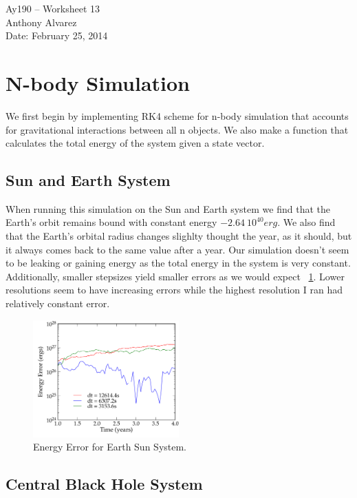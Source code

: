 \documentclass[11pt,letterpaper]{article}
\begin{document}
\begin{center}
\Large
Ay190 -- Worksheet 13\\
Anthony Alvarez\\
Date: February 25, 2014
\end{center}

\section{N-body Simulation}

We first begin by implementing RK4 scheme for n-body simulation that accounts
 for gravitational interactions between all n objects. We also make
a function that calculates the total energy of the system given a 
state vector. 

\subsection{Sun and Earth System}

When running this simulation on the Sun and Earth system we find that the Earth's
orbit remains bound with constant energy $-2.64\ 10^{40} erg$. We also find that
the Earth's orbital radius changes slighlty thought the year, as it should, but
it always comes back to the same value after a year. Our simulation doesn't
seem to be leaking or gaining energy as the total energy in the system is
very constant. Additionally, smaller stepsizes yield smaller errors as we 
would expect ~\ref{fig:phi}. Lower resolutions seem to have increasing errors while the 
highest resolution I ran had relatively constant error. 

\begin{figure}[bth]
\centering
\includegraphics[width=0.5\textwidth]{3.pdf}
\caption{Energy Error for Earth Sun System.}
\label{fig:phi}
\end{figure}

\subsection{Central Black Hole System}
\end{document}
